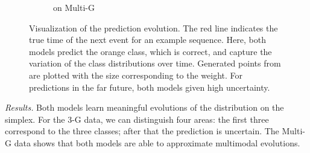 \begin{figure}
\begin{subfigure}{.24\textwidth}
        \caption*{\GPModel on Multi-G}
    \end{subfigure}
    \caption{Visualization of the prediction evolution. The red line indicates the true time of the next event for an example sequence. Here, both models predict the orange class, which is correct, and capture the variation of the class distributions over time. Generated points from \GPModel are plotted with the size corresponding to the weight. For predictions in the far future, both models given high uncertainty.}
    \label{fig:visualization}
    \vspace*{-0.5cm}
\end{figure}

\textit{Results.} Both models learn meaningful evolutions of the distribution on the simplex. For the 3-G data, we can distinguish four areas: the first three correspond to the three classes; after that the prediction is uncertain.
The Multi-G data shows that both models are able to approximate multimodal evolutions.
